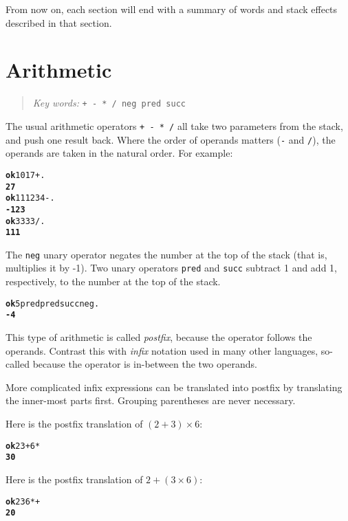\documentclass[english]{book}
\newcommand{\chapkeywords}[1]{{\parbox{10cm}{\begin{minipage}[b]{10cm}
\begin{quote}
\emph{Key words:} \texttt{#1}
\end{quote}
\end{minipage}}}}
\begin{document}
From now on, each section will end with a summary of words and stack effects described in that section.

\section{Arithmetic}

\chapkeywords{+ - {*} / neg pred succ}
\index{\texttt{+}}
\index{\texttt{-}}
\index{\texttt{*}}
\index{\texttt{/}}

The usual arithmetic operators \texttt{+ - {*} /} all take two parameters
from the stack, and push one result back. Where the order of operands
matters (\texttt{-} and \texttt{/}), the operands are taken in the natural order. For example:

\begin{alltt}
\textbf{ok} 10 17 + .
\textbf{27}
\textbf{ok} 111 234 - .
\textbf{-123}
\textbf{ok} 333 3 / .
\textbf{111}
\end{alltt}

The \texttt{neg} unary operator negates the number at the top of the stack (that is, multiplies it by -1). Two unary operators \texttt{pred} and \texttt{succ} subtract 1 and add 1, respectively, to the number at the top of the stack.

\begin{alltt}
\textbf{ok} 5 pred pred succ neg .
\textbf{-4}
\end{alltt}

This type of arithmetic is called \emph{postfix}, because the operator
follows the operands. Contrast this with \emph{infix} notation used
in many other languages, so-called because the operator is in-between
the two operands.

More complicated infix expressions can be translated into postfix
by translating the inner-most parts first. Grouping parentheses are
never necessary.

Here is the postfix translation of $(2 + 3) \times 6$:

\begin{alltt}
\textbf{ok} 2 3 + 6 {*}
\textbf{30}
\end{alltt}

Here is the postfix translation of $2 + (3 \times 6)$:

\begin{alltt}
\textbf{ok} 2 3 6 {*} +
\textbf{20}
\end{alltt}
\end{document}
